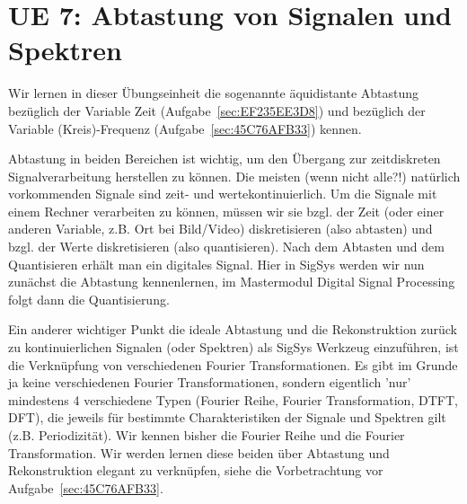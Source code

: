 \clearpage
\section{UE 7: Abtastung von Signalen und Spektren}
\label{sec:ue7_abtastung}

Wir lernen in dieser Übungseinheit die sogenannte äquidistante Abtastung bezüglich
der Variable Zeit (Aufgabe~\ref{sec:EF235EE3D8}) und bezüglich
der Variable (Kreis)-Frequenz (Aufgabe~\ref{sec:45C76AFB33}) kennen.
%

Abtastung in beiden Bereichen ist wichtig, um den Übergang zur zeitdiskreten
Signalverarbeitung herstellen zu können.
%
Die meisten (wenn nicht alle?!) natürlich vorkommenden Signale sind zeit- und
wertekontinuierlich.
%
Um die Signale mit einem Rechner verarbeiten zu können, müssen wir sie bzgl. der
Zeit (oder einer anderen Variable, z.B. Ort bei Bild/Video)
diskretisieren (also abtasten) und bzgl. der Werte diskretisieren
(also quantisieren).
%
Nach dem Abtasten und dem Quantisieren erhält man ein digitales Signal.
%
Hier in SigSys werden wir nun zunächst die Abtastung kennenlernen, im Mastermodul
Digital Signal Processing folgt dann die Quantisierung.
%

Ein anderer wichtiger Punkt die ideale Abtastung und die Rekonstruktion zurück
zu kontinuierlichen Signalen (oder Spektren) als SigSys Werkzeug einzuführen, ist
die Verknüpfung von verschiedenen Fourier Transformationen.
%
Es gibt im Grunde ja keine verschiedenen Fourier Transformationen, sondern
eigentlich 'nur' mindestens 4 verschiedene Typen
(Fourier Reihe, Fourier Transformation, DTFT, DFT), die jeweils für bestimmte
Charakteristiken der Signale und Spektren gilt (z.B. Periodizität).
%
Wir kennen bisher die Fourier Reihe und die Fourier Transformation.
%
Wir werden lernen diese beiden über Abtastung und Rekonstruktion elegant zu
verknüpfen, siehe die Vorbetrachtung vor Aufgabe~\ref{sec:45C76AFB33}.

